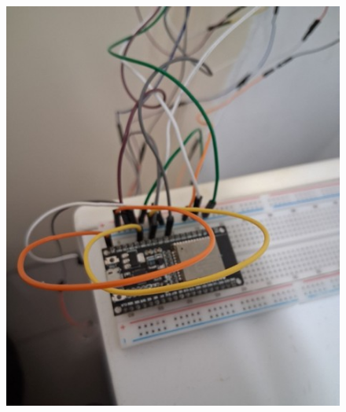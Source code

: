 \begin{figure}[h!]
\begin{minipage}{0.48\textwidth}
{            \includegraphics[width=\linewidth]{img/bp/wachtruimtes/technische_uitwerking/testesp.jpg}
        }
    \end{minipage}
    \begin{minipage}{0.48\textwidth}
        \centering
\end{minipage}
\end{figure}
